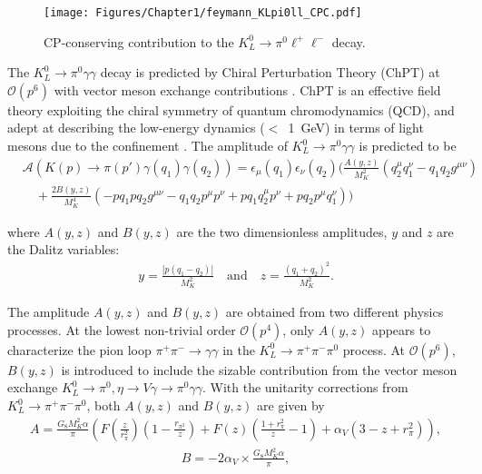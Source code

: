 \begin{figure}[h]
\begin{center}
\captionsetup{width=.99\linewidth}
\texttt{[image: Figures/Chapter1/feymann\_KLpi0ll\_CPC.pdf]}
\caption{CP-conserving contribution to the ${K_L^0 \to \pi^0 \ell^+ \ell^-}$ decay.}
\label{fig:feymann_KLpi0ll_CPC}
\end{center}
\end{figure}

%

The ${K_L^0 \to \pi^0 \gamma \gamma}$ decay is predicted by Chiral Perturbation Theory (ChPT) at $\mathcal{O}(p^6)$ with vector meson exchange contributions \parencite{KLpi0gg_ChPT_p6_VMD}. ChPT is an effective field theory exploiting the chiral symmetry of quantum chromodynamics (QCD), and adept at describing the low-energy dynamics ($<$~1~GeV) in terms of light mesons due to the confinement \parencite{ChPT}. The amplitude of ${K_L^0 \to \pi^0 \gamma \gamma}$ is predicted to be \parencite{ChPT_VMD_kaon}
%
\vspace{1em}
\begin{align}
&\mathcal{A}( K(p)\to\pi(p')\gamma(q_1)\gamma(q_2) ) = \epsilon_{\mu} (q_1) \epsilon_{\nu} ( q_2 ) 
\bigg( \frac{A(y,z)}{M_K^2} (q_2^{\mu} q_1^{\nu} - q_1 q_2 g^{\mu \nu}) \nonumber \\
&\quad + \frac{2B(y,z)}{M_K^4} ( -pq_1 p q_2 g^{\mu \nu} -q_1 q_2 p^{\mu} p^{\nu} + p q_1 q_2^{\mu} p^{\nu} + p q_2 p^{\mu} q_1^{\nu} ) \bigg)  \label{eq:klpi0gg_generator}
\end{align}

\noindent
where $A(y,z)$ and $B(y,z)$ are the two dimensionless amplitudes, $y$ and $z$ are the Dalitz variables:
\begin{align*}
y = \frac{|p(q_1-q_2)|}{M_K^2} \quad \text{and} \quad z = \frac{(q_1 + q_2)^2}{M_K^2}.
\end{align*}

\noindent
The amplitude $A(y,z)$ and $B(y,z)$ are obtained from two different physics processes. At the lowest non-trivial order $\mathcal{O}(p^4)$, only $A(y,z)$ appears to characterize the pion loop $\pi^+\pi^-\to\gamma\gamma$ in the $K_L^0\to\pi^+\pi^-\pi^0$ process. At $\mathcal{O}(p^6)$, $B(y,z)$ is introduced to include the sizable contribution from the vector meson exchange $K_L^0 \to \pi^0,\eta \to V \gamma \to \pi^0 \gamma \gamma$. With the unitarity corrections from ${K_L^0\to\pi^+\pi^-\pi^0}$, both $A(y,z)$ and $B(y,z)$ are given by
%
\vspace{1em}
\begin{align}
A = \frac{G_8M_K^2\alpha}{\pi} \left( F\left( \frac{z}{r_{\pi}^2} \right) \left( 1 - \frac{r_{\pi^2}}{z} \right) + F(z) \left( \frac{1+r_{\pi}^2}{z} - 1 \right) + \alpha_V(3-z+r_{\pi}^2) \right),
\end{align}
%
\begin{align}
B = -2 \alpha_V \times \frac{G_8 M_K^2 \alpha}{\pi},
\end{align}

